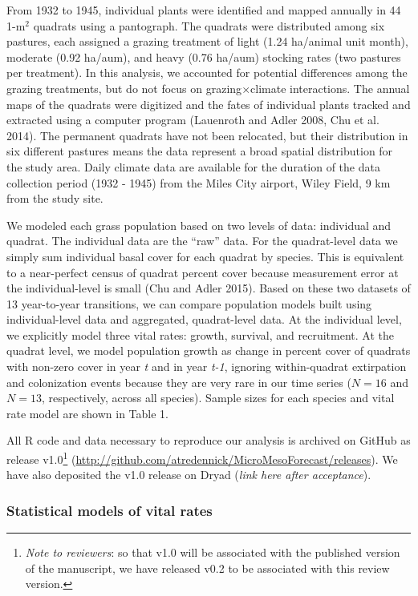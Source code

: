 \documentclass[12pt,]{article}
\let\rmarkdownfootnote\footnote%
\def\footnote{\protect\rmarkdownfootnote}
\begin{document}
From 1932 to 1945, individual plants were identified and mapped annually
in 44 1-\(\text{m}^2\) quadrats using a pantograph. The quadrats were
distributed among six pastures, each assigned a grazing treatment of
light (1.24 ha/animal unit month), moderate (0.92 ha/aum), and heavy
(0.76 ha/aum) stocking rates (two pastures per treatment). In this
analysis, we accounted for potential differences among the grazing
treatments, but do not focus on grazing\(\times\)climate interactions.
The annual maps of the quadrats were digitized and the fates of
individual plants tracked and extracted using a computer program
(Lauenroth and Adler 2008, Chu et al. 2014). The permanent quadrats have
not been relocated, but their distribution in six different pastures
means the data represent a broad spatial distribution for the study
area. Daily climate data are available for the duration of the data
collection period (1932 - 1945) from the Miles City airport, Wiley
Field, 9 km from the study site.

We modeled each grass population based on two levels of data: individual
and quadrat. The individual data are the ``raw'' data. For the
quadrat-level data we simply sum individual basal cover for each quadrat
by species. This is equivalent to a near-perfect census of quadrat
percent cover because measurement error at the individual-level is small
(Chu and Adler 2015). Based on these two datasets of 13 year-to-year
transitions, we can compare population models built using
individual-level data and aggregated, quadrat-level data. At the
individual level, we explicitly model three vital rates: growth,
survival, and recruitment. At the quadrat level, we model population
growth as change in percent cover of quadrats with non-zero cover in
year \emph{t} and in year \emph{t-1}, ignoring within-quadrat
extirpation and colonization events because they are very rare in our
time series (\(N=16\) and \(N=13\), respectively, across all species).
Sample sizes for each species and vital rate model are shown in Table 1.

All R code and data necessary to reproduce our analysis is archived on
GitHub as release v1.0\footnote{\emph{Note to reviewers}: so that v1.0
  will be associated with the published version of the manuscript, we
  have released v0.2 to be associated with this review version.}
(\url{http://github.com/atredennick/MicroMesoForecast/releases}). We
have also deposited the v1.0 release on Dryad (\emph{link here after
acceptance}).

\subsubsection{Statistical models of vital
rates}\label{statistical-models-of-vital-rates}
\end{document}
